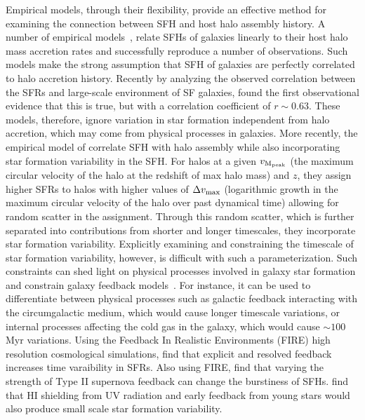 \documentclass[12pt, letterpaper, preprint, tighten]{aastex62}
\newcommand{\edt}[1]{{\color{dred}{\bf} #1}}
\begin{document}
Empirical models, \edt{through their} flexibility, provide an effective 
method for examining the connection between SFH and host halo assembly 
history. A number of empirical models~\citep{taghizadeh-popp2015, becker2015, rodriguez-puebla2016a, mitra2017, cohn2017, moster2017},
relate SFHs of galaxies linearly to their host halo mass accretion
rates and successfully reproduce a number of observations. Such models
make the strong assumption that SFH of galaxies are perfectly 
correlated to halo accretion history. 
\edt{Recently by analyzing the observed correlation between the SFRs 
and large-scale environment of SF galaxies, \cite{tinker2018b} found the 
first observational evidence that this is true, but with a correlation 
coefficient of $r \sim 0.63$.}
These models, therefore, ignore variation in star formation independent 
from halo accretion, which may come from physical processes in galaxies. 
More recently, the empirical model of \cite{behroozi2018} correlate SFH
with halo assembly while also incorporating star formation variability in
the SFH. For halos at a given $v_{\rm M_{peak}}$ (the maximum circular
velocity of the halo at the redshift of max halo mass) and $z$, they
assign higher SFRs to halos with higher values of $\Delta v_{\rm max}$
(logarithmic growth in the maximum circular velocity of the halo over past dynamical time)
allowing for random scatter in the assignment. Through this random scatter,
which is further separated into contributions from shorter and longer timescales,
they incorporate star formation variability. Explicitly examining and constraining
the timescale of star formation variability, however, is difficult with such a
parameterization. \edt{Such constraints can} shed light on physical 
processes involved in galaxy star formation and
constrain galaxy feedback models~\citep{sparre2015}. For instance,
it can be used to differentiate between physical processes such
as galactic feedback interacting with the circumgalactic medium, which
would cause longer timescale variations, or internal processes affecting
the cold gas in the galaxy, which would cause $\sim 100$ Myr variations.
Using the Feedback In Realistic Environments (FIRE) high resolution
cosmological simulations, \cite{hopkins2014} find that
explicit and resolved feedback increases time varaibility in SFRs.
Also using FIRE, \cite{sparre2017} find that varying the strength of
Type II supernova feedback can change the burstiness of SFHs.
\cite{governato2015} find that HI shielding from UV radiation and
early feedback from young stars would also produce small scale star
formation variability.
\end{document}
